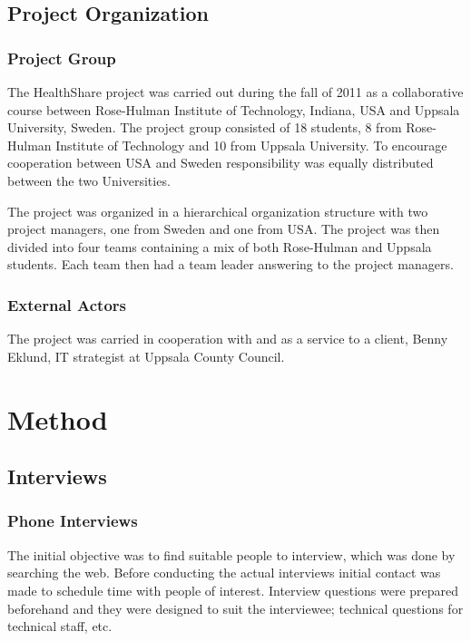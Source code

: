 \documentclass[14pt]{article}
\begin{document}
\subsection{Project Organization}
\subsubsection{Project Group}
\label{sec:ProjectGroup}
The HealthShare project was carried out during the fall of 2011 as a collaborative course between Rose-Hulman Institute of Technology, Indiana, USA and Uppsala University, Sweden.
The project group consisted of 18 students, 8 from Rose-Hulman Institute of Technology and 10 from Uppsala University. To encourage cooperation between USA and Sweden responsibility was equally distributed between the two Universities.

The project was organized in a hierarchical organization structure with two project managers, one from Sweden and one from USA. The project was then divided into four teams containing a mix of both Rose-Hulman and Uppsala students. Each team then had a team leader answering to the project managers.

\subsubsection{External Actors}
The project was carried in cooperation with and as a service to a client, Benny Eklund, IT strategist at Uppsala County Council.


\newpage

\section{Method}
\label{sec:Method}
\subsection{Interviews}

\subsubsection{Phone Interviews}

The initial objective was to find suitable people to interview, which was done by searching the web. Before conducting the actual interviews initial contact was made to schedule time with people of interest. Interview questions were prepared  beforehand and they were designed to suit the interviewee; technical questions for technical staff, etc. 
\end{document}
